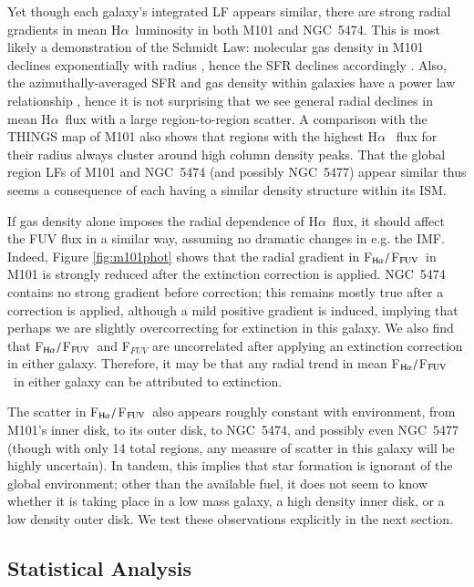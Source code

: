 \documentclass[iop]{emulateapj}
\newcommand{\ha}{H$\alpha$}
\newcommand{\hafuv}{F$_{\rm H\alpha}/$F$_{\rm FUV}$}
\begin{document}
Yet though each galaxy's integrated LF appears similar, there are
strong radial gradients in mean \ha \ luminosity in both M101 and
NGC~5474.  This is most likely a demonstration of the Schmidt Law:
molecular gas density in M101 declines exponentially with radius
\citep[e.g.][]{kenney91}, hence the SFR declines accordingly
\citep{kennicutt07, bigiel08}.  Also, the azimuthally-averaged SFR and
gas density within galaxies have a power law relationship \citep[up to
  the threshold density;][]{kennicutt98}, hence it is not surprising
that we see general radial declines in mean \ha \ flux with a large
region-to-region scatter.  A comparison with the THINGS  map
of M101 \citep{walter08} also shows that regions with the highest \ha
\ flux for their radius always cluster around high  column
density peaks.  That the global  region LFs of M101
and NGC~5474 (and possibly NGC~5477) appear similar thus seems a
consequence of each having a similar density structure within its
ISM.

If gas density alone imposes the radial dependence of \ha \ flux, it
should affect the FUV flux in a similar way, assuming no dramatic
changes in e.g. the IMF.  Indeed, Figure \ref{fig:m101phot} shows that
the radial gradient in \hafuv \ in M101 is strongly reduced after the
extinction correction is applied.  NGC~5474 contains no strong
gradient before correction; this remains mostly true after a
correction is applied, although a mild positive gradient is induced,
implying that perhaps we are slightly overcorrecting for extinction in
this galaxy.  We also find that \hafuv \ and F$_{FUV}$ are
  uncorrelated after applying an extinction correction in either
  galaxy.  Therefore, it may be that any radial trend in mean \hafuv
\ in either galaxy can be attributed to extinction.

The scatter in \hafuv \ also appears roughly constant with
environment, from M101's inner disk, to its outer disk, to NGC~5474,
and possibly even NGC~5477 (though with only 14 total 
regions, any measure of scatter in this galaxy will be highly
uncertain).  In tandem, this implies that star formation is ignorant
of the global environment; other than the available fuel, it does not
seem to know whether it is taking place in a low mass galaxy, a high
density inner disk, or a low density outer disk.  We test these
observations explicitly in the next section.

\subsection{Statistical Analysis}
\end{document}
